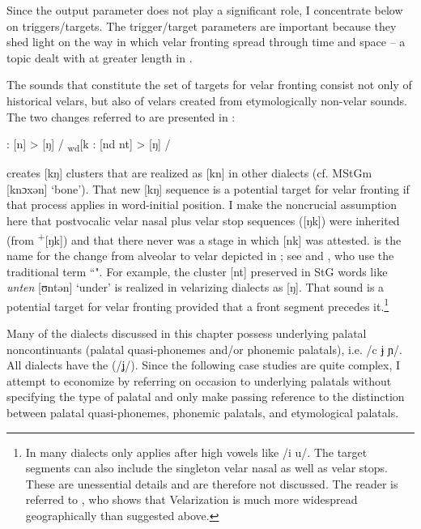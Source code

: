 Since the output parameter does not play a significant role, I concentrate below on triggers/targets. The trigger/target parameters are important because they shed light on the way in which velar fronting spread through time and space -- a topic dealt with at greater length in .

The sounds that constitute the set of targets for velar fronting consist not only of historical velars, but also of velars created from etymologically non-velar sounds. The two changes referred to are presented in :

\ea%
\label{ex:11:1}
\ea\label{ex:11:1a}:   [n] > [ŋ] / \textsubscript{wd}[k {\longrule}
\ex\label{ex:11:1b}:         [nd nt] > [ŋ] / {\longrule}
\z 
\z 

 creates [kŋ] clusters that are realized as [kn] in other dialects (cf. MStGm [knɔxən] ‘bone’). That new [kŋ] sequence is a potential target for velar fronting if that process applies in word-initial position. I make the noncrucial assumption here that postvocalic velar nasal plus velar stop sequences ([ŋk]) were inherited (from  \textsuperscript{+}[ŋk]) and that there never was a stage in which [nk] was attested.  is the name for the change from alveolar to velar depicted in ; see \citet[395--400]{Schirmunski1962} and \citet{Werlen1983}, who use the traditional term “". For example, the cluster [nt] preserved in StG words like \textit{unten} [ʊntən] ‘under’ is realized in velarizing dialects as [ŋ]. That sound is a potential target for velar fronting provided that a front segment precedes it.\footnote{{In many dialects  only applies after high vowels like /i u/. The target segments can also include the singleton velar nasal as well as velar stops. These are unessential details and are therefore not discussed. The reader is referred to \citet[Chapter 8]{Streck2012}, who shows that Velarization is much more widespread geographically than suggested above.} }

Many of the dialects discussed in this chapter possess underlying palatal noncontinuants (palatal quasi-phonemes and/or phonemic palatals), i.e. /c ɉ ɲ/. All dialects have the  (/ʝ/). Since the following case studies are quite complex, I attempt to economize by referring on occasion to underlying palatals without specifying the type of palatal and only make passing reference to the distinction between palatal quasi-phonemes, phonemic palatals, and etymological palatals.

